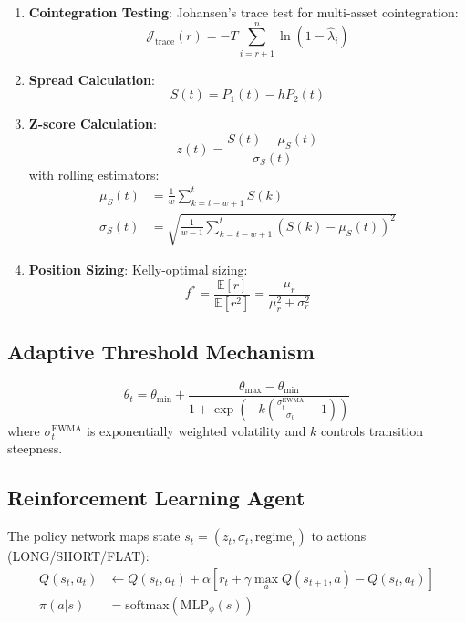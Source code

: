 \documentclass[12pt]{article}
\begin{document}
\begin{enumerate}
    \item \textbf{Cointegration Testing}: Johansen's trace test for multi-asset cointegration:
    \begin{equation}
    \mathcal{J}_{\text{trace}}(r) = -T \sum_{i=r+1}^n \ln(1 - \hat{\lambda}_i)
    \end{equation}
    
    \item \textbf{Spread Calculation}:
    \begin{equation}
    S(t) = P_1(t) - hP_2(t)
    \end{equation}
    
    \item \textbf{Z-score Calculation}:
    \begin{equation}
    z(t) = \frac{S(t) - \mu_S(t)}{\sigma_S(t)}
    \end{equation}
    with rolling estimators:
    \begin{align}
    \mu_S(t) &= \frac{1}{w} \sum_{k=t-w+1}^t S(k) \\
    \sigma_S(t) &= \sqrt{\frac{1}{w-1} \sum_{k=t-w+1}^t (S(k) - \mu_S(t))^2}
    \end{align}
    
    \item \textbf{Position Sizing}: Kelly-optimal sizing:
    \begin{equation}
    f^* = \frac{\mathbb{E}[r]}{\mathbb{E}[r^2]} = \frac{\mu_r}{\mu_r^2 + \sigma_r^2}
    \end{equation}
\end{enumerate}

\subsection{Adaptive Threshold Mechanism}
\begin{equation}
\theta_t = \theta_{\min} + \frac{\theta_{\max} - \theta_{\min}}{1 + \exp\left(-k\left(\frac{\sigma_t^{\text{EWMA}}}{\sigma_0} - 1\right)\right)}
\end{equation}
where $\sigma_t^{\text{EWMA}}$ is exponentially weighted volatility and $k$ controls transition steepness.

\subsection{Reinforcement Learning Agent}
The policy network maps state $s_t = (z_t, \sigma_t, \text{regime}_t)$ to actions (LONG/SHORT/FLAT):
\begin{align}
Q(s_t,a_t) &\leftarrow Q(s_t,a_t) + \alpha \left[ r_t + \gamma \max_a Q(s_{t+1},a) - Q(s_t,a_t) \right] \\
\pi(a|s) &= \text{softmax}\left( \text{MLP}_{\phi}(s) \right)
\end{align}
\end{document}
